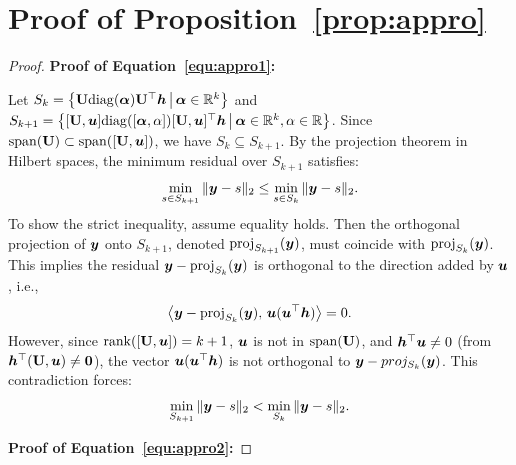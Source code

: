 \documentclass{article} %
\def\valpha{{\bm\alpha}}
\begin{document}
	
	\section{Proof of Proposition~\ref{prop:appro}}
	\label{sec:appro}
	\begin{proof}
		\textbf{Proof of Equation~\ref{equ:appro1}:}
		
		Let $S_k = \left\{ \rmU \mathrm{diag}(\valpha) \rmU^\top \vh \, \big| \, \valpha \in \mathbb{R}^k \right\}$ and $S_{k+1} = \left\{ [\rmU, \vu] \mathrm{diag}([\valpha, \alpha]) [\rmU, \vu]^\top \vh \, \big| \, \valpha \in \mathbb{R}^k, \alpha \in \mathbb{R} \right\}$.
		Since $\mathrm{span}({\mathbf{U}}) \subset \mathrm{span}([{\mathbf{U}}, {\bm{u}}])$, we have \( S_k \subseteq S_{k+1} \).
		By the projection theorem in Hilbert spaces, the minimum residual over $S_{k+1}$ satisfies:
		\begin{equation}
			\begin{aligned}
				\min_{s \in S_{k+1}} \| {\bm{y}} - s \|_2 \leq \min_{s \in S_k} \| {\bm{y}} - s \|_2.
			\end{aligned}
		\end{equation}
		To show the strict inequality, assume equality holds.
		Then the orthogonal projection of ${\bm{y}}$ onto $S_{k+1}$, denoted $\mathrm{proj}_{S_{k+1}}({\bm{y}})$, must coincide with $\mathrm{proj}_{S_k}({\bm{y}})$. This implies the residual ${\bm{y}} - \textrm{proj}_{S_k}({\bm{y}})$ is orthogonal to the direction added by ${\bm{u}}$, i.e.,
		\begin{equation}
			\begin{aligned}
				\left\langle {\bm{y}} - \mathrm{proj}_{S_k}({\bm{y}}), \, {\bm{u}} ({\bm{u}}^\top {\bm{h}}) \right\rangle = 0.
			\end{aligned}
		\end{equation}
		However, since $\mathrm{rank}([{\mathbf{U}}, {\bm{u}}]) = k+1$, ${\bm{u}}$ is not in $\mathrm{span}({\mathbf{U}})$, and ${\bm{h}}^\top {\bm{u}} \neq 0$ (from ${\bm{h}}^\top ({\mathbf{U}}, {\bm{u}}) \neq \mathbf{0}$), the vector ${\bm{u}} ({\bm{u}}^\top {\bm{h}})$ is not orthogonal to ${\bm{y}} - proj_{S_k}({\bm{y}})$.
		This contradiction forces:
		\begin{equation}
			\begin{aligned}
				\min_{S_{k+1}} \| {\bm{y}} - s \|_2 < \min_{S_k} \| {\bm{y}} - s \|_2.
			\end{aligned}
		\end{equation}
		
		\textbf{Proof of Equation~\ref{equ:appro2}:}
		

\end{proof}
\end{document}
